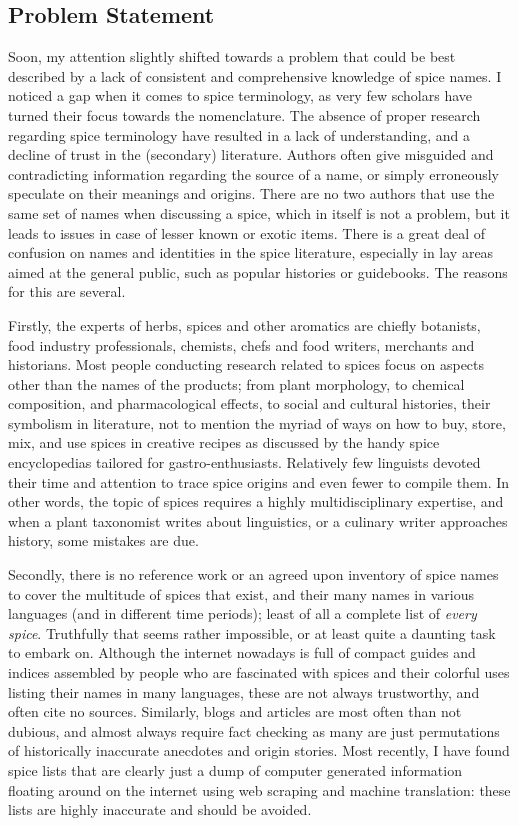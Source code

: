 \subsection{Problem Statement}

Soon, my attention slightly shifted towards a problem that could be best described by a lack of consistent and comprehensive knowledge of spice names. I noticed a gap when it comes to spice terminology, as very few scholars have turned their focus towards the nomenclature. The absence of proper research regarding spice terminology have resulted in a lack of understanding, and a decline of trust in the (secondary) literature. Authors often give misguided and contradicting information regarding the source of a name, or simply erroneously speculate on their meanings and origins. There are no two authors that use the same set of names when discussing a spice, which in itself is not a problem, but it leads to issues in case of lesser known or exotic items. There is a great deal of confusion on names and identities in the spice literature, especially in lay areas aimed at the general public, such as popular histories or guidebooks. The reasons for this are several.

Firstly, the experts of herbs, spices and other aromatics are chiefly botanists, food industry professionals, chemists, chefs and food writers, merchants and historians. Most people conducting research related to spices focus on aspects other than the names of the products; from plant morphology, to chemical composition, and pharmacological effects, to social and cultural histories, their symbolism in literature, not to mention the myriad of ways on how to buy, store, mix, and use spices in creative recipes as discussed by the handy spice encyclopedias tailored for gastro-enthusiasts. Relatively few linguists devoted their time and attention to trace spice origins and even fewer to compile them. In other words, the topic of spices requires a highly multidisciplinary expertise, and when a plant taxonomist writes about linguistics, or a culinary writer approaches history, some mistakes are due.

Secondly, there is no reference work or an agreed upon inventory of spice names to cover the multitude of spices that exist, and their many names in various languages (and in different time periods); least of all a complete list of \emph{every spice}. Truthfully that seems rather impossible, or at least quite a daunting task to embark on. Although the internet nowadays is full of compact guides and indices assembled by people who are fascinated with spices and their colorful uses listing their names in many languages, these are not always trustworthy, and often cite no sources. Similarly, blogs and articles are most often than not dubious, and almost always require fact checking as many are just permutations of historically inaccurate anecdotes and origin stories. Most recently, I have found spice lists that are clearly just a dump of computer generated information floating around on the internet using web scraping and machine translation: these lists are highly inaccurate and should be avoided.

